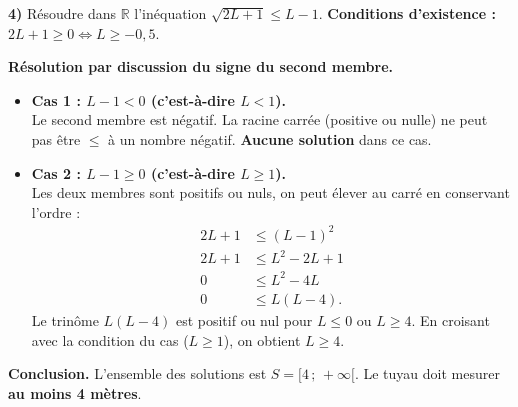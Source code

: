 \documentclass[11pt]{article}
\begin{document}
\begin{exoresolu}
\textbf{4)} Résoudre dans $\mathbb{R}$ l'inéquation $\sqrt{2L+1} \leq L - 1$.
\tcblower
\textbf{Conditions d'existence :} $2L+1 \geq 0 \iff L \geq -0,5$.

\textbf{Résolution par discussion du signe du second membre.}
\begin{itemize}
\item \textbf{Cas 1 : $L - 1 < 0$ (c'est-à-dire $L < 1$).} \\
Le second membre est négatif. La racine carrée (positive ou nulle) ne peut pas être $\leq$ à un nombre négatif. \textbf{Aucune solution} dans ce cas.
\item \textbf{Cas 2 : $L - 1 \geq 0$ (c'est-à-dire $L \geq 1$).} \\
Les deux membres sont positifs ou nuls, on peut élever au carré en conservant l'ordre :
\begin{align*}
2L + 1 &\leq (L-1)^2 \\
2L + 1 &\leq L^2 - 2L + 1 \\
0 &\leq L^2 - 4L \\
0 &\leq L(L - 4).
\end{align*}
Le trinôme $L(L-4)$ est positif ou nul pour $L \leq 0$ ou $L \geq 4$.
En croisant avec la condition du cas ($L \geq 1$), on obtient $L \geq 4$.
\end{itemize}

\textbf{Conclusion.} L'ensemble des solutions est $S = [4\,;\,+\infty[$. Le tuyau doit mesurer \textbf{au moins 4 mètres}.
\end{exoresolu}
\end{document}
